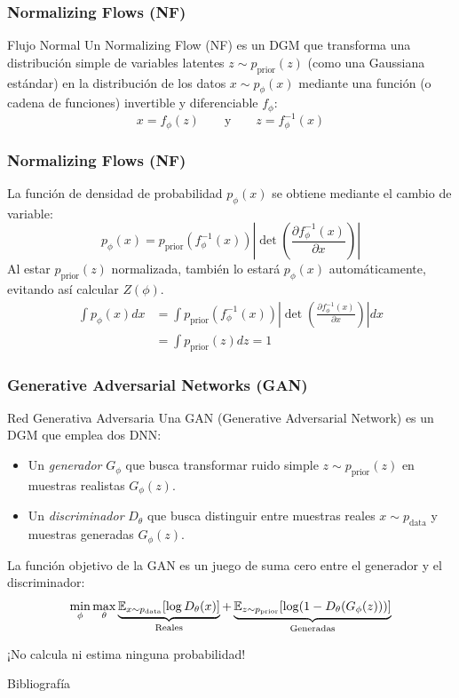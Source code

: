 \documentclass{beamer}
\begin{document}
\begin{frame}
	\frametitle{Normalizing Flows (NF)}
	\begin{definitionblock}{Flujo Normal}
		Un Normalizing Flow (NF) es un DGM que transforma una distribución simple de variables latentes $z \sim p_{\text{prior}}(z)$ (como una Gaussiana estándar) en la distribución de los datos $x \sim p_{\phi}(x)$ mediante una función (o cadena de funciones) invertible y diferenciable $f_{\phi}$:
		\begin{equation*}
			x = f_{\phi}(z) \qquad \text{y} \qquad z = f_{\phi}^{-1}(x)
		\end{equation*}
	\end{definitionblock}
\end{frame}
\begin{frame}
	\frametitle{Normalizing Flows (NF)}

	La función de densidad de probabilidad $p_{\phi}(x)$ se obtiene mediante el cambio de variable:
	\begin{equation*}
		p_{\phi}(x) = p_{\text{prior}}(f_{\phi}^{-1}(x)) \left| \det \left( \frac{\partial f_{\phi}^{-1}(x)}{\partial x} \right) \right|
	\end{equation*}
	\pause
	Al estar $p_{\text{prior}}(z)$ normalizada, también lo estará $p_{\phi}(x)$ automáticamente, evitando así calcular $Z({\phi})$.
	\begin{align*}
		\int p_{\phi}(x) dx
		&= \int p_{\text{prior}}(f_{\phi}^{-1}(x)) \left| \det \left( \frac{\partial f_{\phi}^{-1}(x)}{\partial x} \right) \right| dx\\
		&= \int p_{\text{prior}}(z) dz = 1
	\end{align*}
\end{frame}

\begin{frame}
	\frametitle{Generative Adversarial Networks (GAN)}
	\begin{definitionblock}{Red Generativa Adversaria}
		Una GAN (Generative Adversarial Network) es un DGM que emplea dos DNN:
		\begin{itemize}
			\item Un \emph{generador} $G_{\phi}$ que busca transformar ruido simple $z \sim p_{\text{prior}}(z)$ en muestras realistas $G_{\phi}(z)$.\pause
			\item Un \emph{discriminador} $D_{\theta}$ que busca distinguir entre muestras reales $x \sim p_{\text{data}}$ y muestras generadas $G_{\phi}(z)$.
		\end{itemize}
	\end{definitionblock}\pause
	La función objetivo de la GAN es un juego de suma cero entre el generador y el discriminador:
	\begin{equation*}
		\min_{\phi} \max_{\theta} \underbrace{\mathbb{E}_{x \sim p_{\text{data}}} [\log D_{\theta}(x)]}_{\text{Reales}} + \underbrace{\mathbb{E}_{z \sim p_{\text{prior}}} [\log (1 - D_{\theta}(G_{\phi}(z)))]}_{\text{Generadas}}
	\end{equation*}\vspace{-0.5cm}
	\pause
	\begin{center}
		\alert{¡No calcula ni estima ninguna probabilidad!}
	\end{center}
\end{frame}

\begin{frame}[allowframebreaks]{Bibliografía}
    \nocite{lai2026principlesdiffusionmodels}
    \printbibliography
\end{frame}
\end{document}
